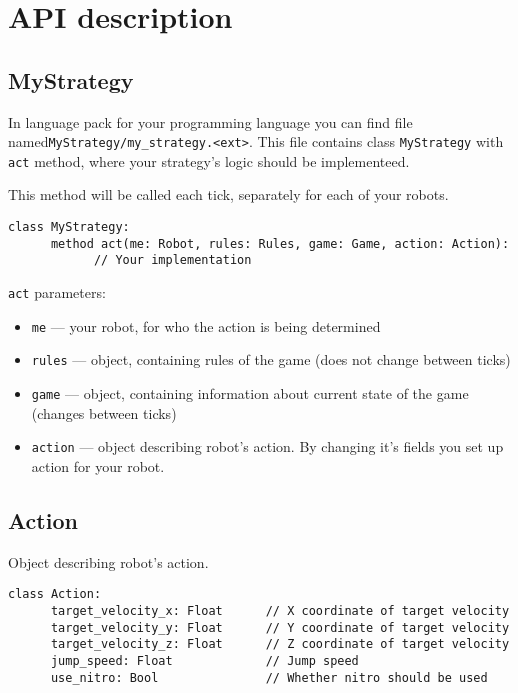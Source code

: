 \chapter{API description}\label{api}

\section{MyStrategy}

In language pack for your programming language you can find file named\texttt{MyStrategy/my\_strategy.<ext>}.
This file contains class \texttt{MyStrategy} with \texttt{act} method, where your strategy's logic should be implementeed.

This method will be called each tick, separately for each of your robots.

\begin{verbatim}
class MyStrategy:
      method act(me: Robot, rules: Rules, game: Game, action: Action):
            // Your implementation
\end{verbatim}

\texttt{act} parameters:
\begin{itemize}
      \item \texttt{me} --- your robot, for who the action is being determined
      \item \texttt{rules} --- object, containing rules of the game (does not change between ticks)
      \item \texttt{game} --- object, containing information about current state of the game (changes between ticks)
      \item \texttt{action} --- object describing robot's action. By changing it's fields you set up action for your robot.
\end{itemize}

\section{Action}

Object describing robot's action.

\begin{verbatim}
class Action:
      target_velocity_x: Float      // X coordinate of target velocity
      target_velocity_y: Float      // Y coordinate of target velocity
      target_velocity_z: Float      // Z coordinate of target velocity
      jump_speed: Float             // Jump speed
      use_nitro: Bool               // Whether nitro should be used
\end{verbatim}

